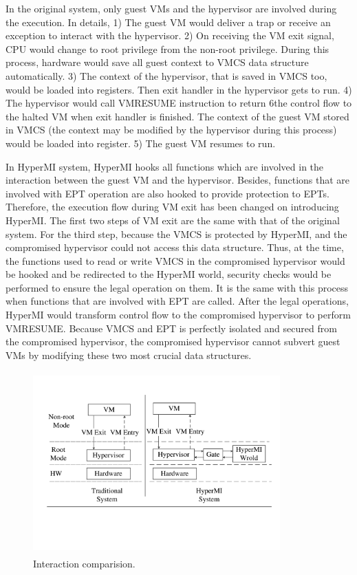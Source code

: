 \documentclass[conference]{IEEEtran}
\begin{document}
In the original system, only guest VMs and the hypervisor are involved during the execution. In details, 1) The guest VM would deliver a trap or receive an exception to interact with the hypervisor. 2) On receiving the VM exit signal, CPU would change to root privilege from the non-root privilege. During this process, hardware would save all guest context to VMCS data structure automatically. 3) The context of the hypervisor, that is saved in VMCS too, would be loaded into registers. Then exit handler in the hypervisor gets to run. 4) The hypervisor would call VMRESUME instruction to return 6the control flow to the halted VM when exit handler is finished. The context of the guest VM stored in VMCS (the context may be modified by the hypervisor during this process) would be loaded into register. 5) The guest VM resumes to run.

In HyperMI system, HyperMI hooks all functions which are involved in the interaction between the guest VM and the hypervisor. Besides, functions that are involved with EPT operation are also hooked to provide protection to EPTs. Therefore, the execution flow during VM exit has been changed on introducing HyperMI. The first two steps of VM exit are the same with that of the original system. For the third step, because the VMCS is protected by HyperMI, and the compromised hypervisor could not access this data structure. Thus, at the time, the functions used to read or write VMCS in the compromised hypervisor would be hooked and be redirected to the HyperMI world, security checks would be performed to ensure the legal operation on them. It is the same with this process when functions that are involved with EPT are called. 
After the legal operations, HyperMI would transform control flow to the compromised hypervisor to perform VMRESUME. Because VMCS and EPT is perfectly isolated and secured from the compromised hypervisor, the compromised hypervisor cannot subvert guest VMs by modifying these two most crucial data structures.

\fi


\begin{figure}
\centerline{\includegraphics[width=9.5cm, height=7cm]{pdfvmcsProcess.pdf}}
\caption{Interaction comparision. } \label{fig+1}
\end{figure}
\end{document}
